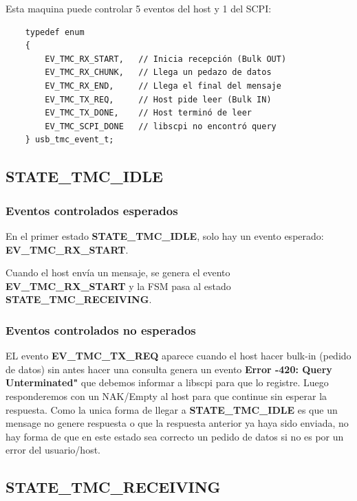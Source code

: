 Esta maquina puede controlar 5 eventos del host y 1 del SCPI:
\begin{verbatim}
    typedef enum
    {
        EV_TMC_RX_START,   // Inicia recepción (Bulk OUT)
        EV_TMC_RX_CHUNK,   // Llega un pedazo de datos
        EV_TMC_RX_END,     // Llega el final del mensaje
        EV_TMC_TX_REQ,     // Host pide leer (Bulk IN)
        EV_TMC_TX_DONE,    // Host terminó de leer
        EV_TMC_SCPI_DONE   // libscpi no encontró query
    } usb_tmc_event_t;
\end{verbatim}

\subsection{STATE\_TMC\_IDLE}
\subsubsection*{Eventos controlados esperados}
En el primer estado \textbf{STATE\_TMC\_IDLE}, solo hay un evento esperado: \textbf{EV\_TMC\_RX\_START}.

Cuando el host envía un mensaje, se genera el evento \textbf{EV\_TMC\_RX\_START} y la FSM pasa al estado \textbf{STATE\_TMC\_RECEIVING}.

\subsubsection*{Eventos controlados no esperados}
EL evento \textbf{EV\_TMC\_TX\_REQ} aparece cuando el host hacer bulk-in (pedido de datos) sin antes hacer una consulta genera un evento \textbf{Error -420: Query Unterminated"} que debemos informar a libscpi para que lo registre. Luego responderemos con un NAK/Empty al host para que continue sin esperar la respuesta. Como la unica forma de llegar a \textbf{STATE\_TMC\_IDLE} es que un mensage no genere respuesta o que la respuesta anterior ya haya sido enviada, no hay forma de que en este estado sea correcto un pedido de datos si no es por un error del usuario/host.

\subsection{STATE\_TMC\_RECEIVING}
